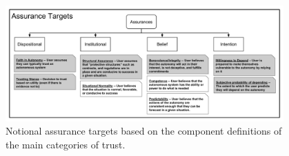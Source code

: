         \begin{figure}[t]%
            \includegraphics[width=0.95\textwidth]{Figures/Assurances.pdf}%
            \caption{Notional assurance targets based on the component definitions of the main categories of trust.}
            \label{fig:Assurance_classes}
        \end{figure}
